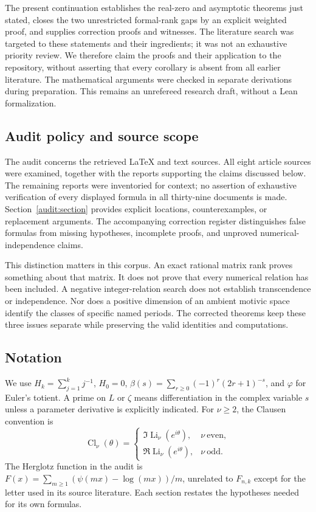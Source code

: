 \documentclass[11pt,a4paper]{article}
\DeclareMathOperator{\Li}{Li}
\theoremstyle{definition}
\theoremstyle{remark}
\numberwithin{equation}{section}
\begin{document}
The present continuation establishes the real-zero and asymptotic
theorems just stated, closes the two unrestricted formal-rank gaps by an
explicit weighted proof, and supplies correction proofs and witnesses.
The literature search was targeted to these statements and their
ingredients; it was not an exhaustive priority review.  We therefore
claim the proofs and their application to the repository, without
asserting that every corollary is absent from all earlier literature.
The mathematical arguments were checked in separate derivations during
preparation.  This remains an unrefereed research draft, without a Lean
formalization.

\subsection{Audit policy and source scope}

The audit concerns the retrieved \LaTeX{} and text sources.  All eight
article sources were examined, together with the reports supporting the
claims discussed below.  The remaining reports were inventoried for
context; no assertion of exhaustive verification of every displayed
formula in all thirty-nine documents is made.
Section~\ref{audit:section} provides explicit locations, counterexamples,
or replacement arguments.  The accompanying correction register
distinguishes false formulas from missing hypotheses, incomplete proofs,
and unproved numerical-independence claims.

This distinction matters in this corpus.  An exact rational matrix rank
proves something about that matrix.  It does not prove that every
numerical relation has been included.  A negative integer-relation
search does not establish transcendence or independence.  Nor does a
positive dimension of an ambient motivic space identify the classes of
specific named periods.  The corrected theorems keep these three issues
separate while preserving the valid identities and computations.

\subsection{Notation}

We use $H_k=\sum_{j=1}^k j^{-1}$, $H_0=0$,
$\beta(s)=\sum_{r\geq0}(-1)^r(2r+1)^{-s}$, and $\varphi$ for Euler's
totient.  A prime on $L$ or $\zeta$ means differentiation in the complex
variable $s$ unless a parameter derivative is explicitly indicated.
For $\nu\geq2$, the Clausen convention is
\[
 \operatorname{Cl}_\nu(\theta)=
 \begin{cases}
  \Im\Li_\nu(e^{i\theta}),&\nu\ \text{even},\\
  \Re\Li_\nu(e^{i\theta}),&\nu\ \text{odd}.
 \end{cases}
\]
The Herglotz function in the audit is
$F(x)=\sum_{m\geq1}(\psi(mx)-\log(mx))/m$, unrelated to
$F_{n,k}$ except for the letter used in its source literature.
Each section restates the hypotheses needed for its own formulas.
\end{document}
